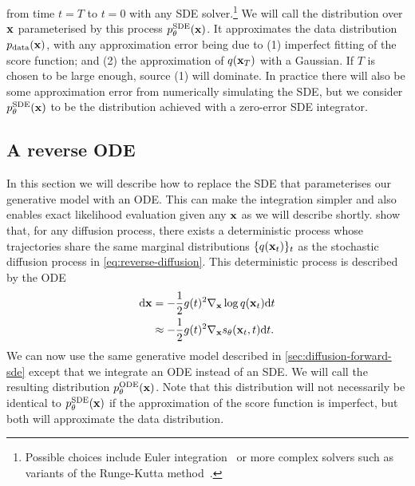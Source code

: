 from time $t=T$ to $t=0$ with any SDE solver.\footnote{Possible choices include Euler integration~\citep{ho2020denoising} or more complex solvers such as variants of the Runge-Kutta method~\citep{debrabant2009families,grathwohl2018ffjord}.} We will call the distribution over ${\mathbf{x}}$ parameterised by this process $p_\theta^\text{SDE}({\mathbf{x}})$. It approximates the data distribution $p_{\rm{data}}({\mathbf{x}})$, with any approximation error being due to (1) imperfect fitting of the score function; and (2) the approximation of $q({\mathbf{x}}_T)$ with a Gaussian. If $T$ is chosen to be large enough, source (1) will dominate. In practice there will also be some approximation error from numerically simulating the SDE, but we consider $p_\theta^\text{SDE}({\mathbf{x}})$ to be the distribution achieved with a zero-error SDE integrator.


\subsection{A reverse ODE} \label{sec:diffusion-ode}
In this section we will describe how to replace the SDE that parameterises our generative model with an ODE. This can make the integration simpler and also enables exact likelihood evaluation given any ${\mathbf{x}}$ as we will describe shortly. \citet{song2020score} show that, for any diffusion process, there exists a deterministic process whose trajectories share the same marginal distributions $\{q({\mathbf{x}}_t)\}_t$ as the stochastic diffusion process in \cref{eq:reverse-diffusion}. This deterministic process is described by the ODE
\begin{align}
    \mathrm{d}{\mathbf{x}} &= - \frac{1}{2} g(t)^2 \nabla_{\mathbf{x}} \log q({\mathbf{x}}_t) \mathrm{d}t \label{eq:diffusion-ode} \\
    &\approx - \frac{1}{2} g(t)^2 \nabla_{\mathbf{x}} s_\theta({\mathbf{x}}_t, t) \mathrm{d}t. \label{eq:diffusion-ode-with-nn}
\end{align}
We can now use the same generative model described in \cref{sec:diffusion-forward-sde} except that we integrate an ODE instead of an SDE. We will call the resulting distribution $p_\theta^\text{ODE}({\mathbf{x}})$. Note that this distribution will not necessarily be identical to $p_\theta^\text{SDE}({\mathbf{x}})$ if the approximation of the score function is imperfect, but both will approximate the data distribution.

